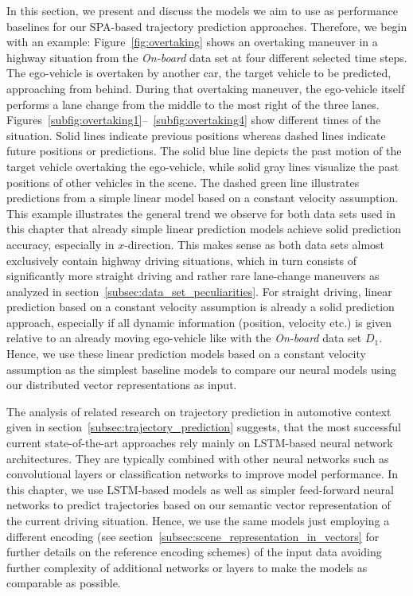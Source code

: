 In this section, we present and discuss the models we aim to use as performance baselines for our \ac{SPA}-based trajectory prediction approaches.
Therefore, we begin with an example:
Figure~\ref{fig:overtaking} shows an overtaking maneuver in a highway situation from the \emph{On-board} data set at four different selected time steps.
The ego-vehicle is overtaken by another car, the target vehicle to be predicted, approaching from behind.
During that overtaking maneuver, the ego-vehicle itself performs a lane change from the middle to the most right of the three lanes.
Figures~\ref{subfig:overtaking1}--~\ref{subfig:overtaking4} show different times of the situation.
Solid lines indicate previous positions whereas dashed lines indicate future positions or predictions.
The solid blue line depicts the past motion of the target vehicle overtaking the ego-vehicle, while solid gray lines visualize the past positions of other vehicles in the scene.
The dashed green line illustrates predictions from a simple linear model based on a constant velocity assumption.
This example illustrates the general trend we observe for both data sets used in this chapter that already simple linear prediction models achieve solid prediction accuracy, especially in $x$-direction.
This makes sense as both data sets almost exclusively contain highway driving situations, which in turn consists of significantly more straight driving and rather rare lane-change maneuvers as analyzed in section~\ref{subsec:data_set_peculiarities}.
For straight driving, linear prediction based on a constant velocity assumption is already a solid prediction approach, especially if all dynamic information (position, velocity etc.) is given relative to an already moving ego-vehicle like with the \emph{On-board} data set $D_1$.
Hence, we use these linear prediction models based on a constant velocity assumption as the simplest baseline models to compare our neural models using our distributed vector representations as input.

The analysis of related research on trajectory prediction in automotive context given in section~\ref{subsec:trajectory_prediction} suggests, that the most successful current state-of-the-art approaches rely mainly on \ac{LSTM}-based neural network architectures.
They are typically combined with other neural networks such as convolutional layers or classification networks \parencite{Deo2018a} to improve model performance.
In this chapter, we use \ac{LSTM}-based models as well as simpler feed-forward neural networks to predict trajectories based on our semantic vector representation of the current driving situation.
Hence, we use the same models just employing a different encoding (see section~\ref{subsec:scene_representation_in_vectors} for further details on the reference encoding schemes) of the input data avoiding further complexity of additional networks or layers to make the models as comparable as possible.


